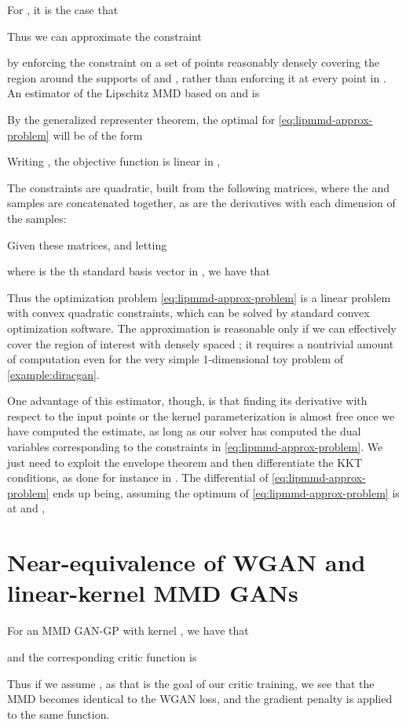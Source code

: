 \documentclass{article}
\begin{document}
For ,
it is the case that

Thus we can approximate the constraint

by enforcing the constraint on a set of  points 
reasonably densely covering the region around the supports of  and ,
rather than enforcing it at every point in .
An estimator of the Lipschitz MMD
based on  and  is

By the generalized representer theorem,
the optimal  for \eqref{eq:lipmmd-approx-problem} will be of the form

Writing ,
the objective function is linear in ,

The constraints are quadratic, built from the following matrices,
where the  and  samples are concatenated together,
as are the derivatives with each dimension of the  samples:

Given these matrices, and letting

where  is the th standard basis vector in ,
we have that

Thus the optimization problem \eqref{eq:lipmmd-approx-problem}
is a linear problem with convex quadratic constraints,
which can be solved by standard convex optimization software.
The approximation is reasonable only if we can effectively cover the region of interest with densely spaced ;
it requires a nontrivial amount of computation even for the very simple 1-dimensional toy problem of \cref{example:diracgan}.

One advantage of this estimator, though,
is that finding its derivative with respect to the input points or the kernel parameterization
is almost free once we have computed the estimate,
as long as our solver has computed the dual variables  corresponding to the constraints in \eqref{eq:lipmmd-approx-problem}.
We just need to exploit the envelope theorem and then differentiate the KKT conditions,
as done for instance in \cite{Amos2017}.
The differential of \eqref{eq:lipmmd-approx-problem} ends up being,
assuming the optimum of \eqref{eq:lipmmd-approx-problem} is at  and ,



\section{Near-equivalence of WGAN and linear-kernel MMD GANs} \label{appendix:wgan-linear-kernel}
For an MMD GAN-GP with kernel ,
we have that

and the corresponding critic function is

Thus if we assume ,
as that is the goal of our critic training,
we see that the MMD becomes identical to the WGAN loss,
and the gradient penalty is applied to the same function.
\end{document}

